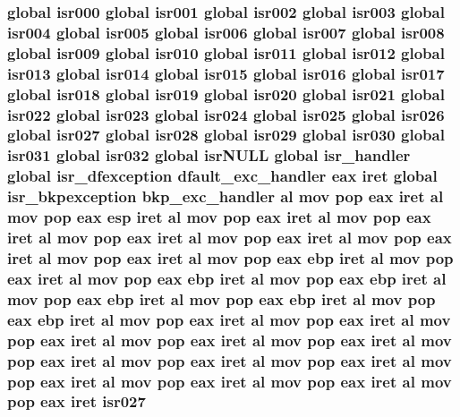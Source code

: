 \subsubsection[{\texorpdfstring{isr027}{isr027}}]{\setlength{\rightskip}{0pt plus 5cm}global {\bf isr000} global {\bf isr001} global {\bf isr002} global {\bf isr003} global {\bf isr004} global {\bf isr005} global {\bf isr006} global {\bf isr007} global {\bf isr008} global {\bf isr009} global {\bf isr010} global {\bf isr011} global {\bf isr012} global {\bf isr013} global {\bf isr014} global {\bf isr015} global {\bf isr016} global {\bf isr017} global {\bf isr018} global {\bf isr019} global {\bf isr020} global {\bf isr021} global {\bf isr022} global {\bf isr023} global {\bf isr024} global {\bf isr025} global {\bf isr026} global isr027 global {\bf isr028} global {\bf isr029} global {\bf isr030} global {\bf isr031} global isr032 global isr\+N\+U\+LL global isr\+\_\+handler global {\bf isr\+\_\+dfexception} {\bf dfault\+\_\+exc\+\_\+handler} eax iret global {\bf isr\+\_\+bkpexception} {\bf bkp\+\_\+exc\+\_\+handler} {\bf al} {\bf mov} pop eax iret {\bf al} {\bf mov} pop eax esp iret {\bf al} {\bf mov} pop eax iret {\bf al} {\bf mov} pop eax iret {\bf al} {\bf mov} pop eax iret {\bf al} {\bf mov} pop eax iret {\bf al} {\bf mov} pop eax iret {\bf al} {\bf mov} pop eax iret {\bf al} {\bf mov} pop eax ebp iret {\bf al} {\bf mov} pop eax iret {\bf al} {\bf mov} pop eax ebp iret {\bf al} {\bf mov} pop eax ebp iret {\bf al} {\bf mov} pop eax ebp iret {\bf al} {\bf mov} pop eax ebp iret {\bf al} {\bf mov} pop eax ebp iret {\bf al} {\bf mov} pop eax iret {\bf al} {\bf mov} pop eax iret {\bf al} {\bf mov} pop eax iret {\bf al} {\bf mov} pop eax iret {\bf al} {\bf mov} pop eax iret {\bf al} {\bf mov} pop eax iret {\bf al} {\bf mov} pop eax iret {\bf al} {\bf mov} pop eax iret {\bf al} {\bf mov} pop eax iret {\bf al} {\bf mov} pop eax iret {\bf al} {\bf mov} pop eax iret {\bf al} {\bf mov} pop eax iret isr027}\hypertarget{isrs_8as_aa3abac86885af66f32a5e91476aaea30}{}\label{isrs_8as_aa3abac86885af66f32a5e91476aaea30}

